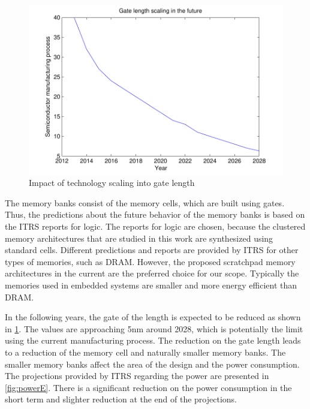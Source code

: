 \begin{figure}
 \centering
 \includegraphics[width = \textwidth]{E/gate.pdf}
  \caption{Impact of technology scaling into gate length}
 \label{fig:gateE}
 \end{figure}
 
The memory banks consist of the memory cells, which are built using gates.
Thus, the predictions about the future behavior of the memory banks is based on the ITRS reports for logic.
The reports for logic are chosen, because the clustered memory architectures that are studied in this work are synthesized using standard cells.
Different predictions and reports are provided by ITRS for other types of memories, such as DRAM.
However, the proposed scratchpad memory architectures in the current are the preferred choice for our scope.
Typically the memories used in embedded systems are smaller and more energy efficient than DRAM.

In the following years, the gate of the length is expected to be reduced as shown in \ref{fig:gateE}.
The values are approaching 5nm around 2028, which is potentially the limit using the current manufacturing process.
The reduction on the gate length leads to a reduction of the memory cell and naturally smaller memory banks.
The smaller memory banks affect the area of the design and the power consumption.
The projections provided by ITRS regarding the power are presented in \ref{fig:powerE}. 
There is a significant reduction on the power consumption in the short term and slighter reduction at the end of the projections.

